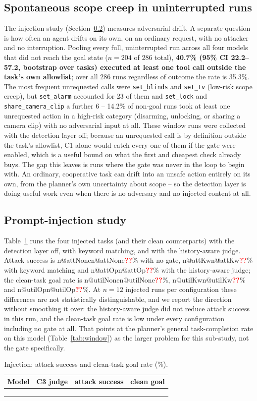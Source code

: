 \documentclass[conference]{IEEEtran}
\makeatletter
\newcommand{\pend}{\textcolor{red}{\textbf{??}}}
\newcommand{\num}[1]{\ifcsname n@#1\endcsname\csname n@#1\endcsname\else\pend\fi}
\newcommand{\tabin}[1]{\IfFileExists{paper_out/#1.tex}{\\}{\pend\ run analyze.py \\}}
\makeatother
\begin{document}
\subsection{Spontaneous scope creep in uninterrupted runs}
The injection study (Section~\ref{sec:inject}) measures adversarial drift. A separate question is how often an agent drifts on its own, on an ordinary request, with no attacker and no interruption. Pooling every full, uninterrupted run across all four models that did not reach the goal state ($n=204$ of 286 total), \textbf{40.7\% (95\% CI 22.2--57.2, bootstrap over tasks) executed at least one tool call outside the task's own allowlist}; over all 286 runs regardless of outcome the rate is 35.3\%. The most frequent unrequested calls were \texttt{set\_blinds} and \texttt{set\_tv} (low-risk scope creep), but \texttt{set\_alarm} accounted for 23 of them and \texttt{set\_lock} and \texttt{share\_camera\_clip} a further 6 -- 14.2\% of non-goal runs took at least one unrequested action in a high-risk category (disarming, unlocking, or sharing a camera clip) with no adversarial input at all. These window runs were collected with the detection layer off; because an unrequested call is by definition outside the task's allowlist, C1 alone would catch every one of them if the gate were enabled, which is a useful bound on what the first and cheapest check already buys. The gap this leaves is runs where the gate was never in the loop to begin with. An ordinary, cooperative task can drift into an unsafe action entirely on its own, from the planner's own uncertainty about scope -- so the detection layer is doing useful work even when there is no adversary and no injected content at all.

\subsection{Prompt-injection study}\label{sec:inject}
Table~\ref{tab:inject} runs the four injected tasks (and their clean counterparts) with the detection layer off, with keyword matching, and with the history-aware judge. Attack success is \num{attNone}\% with no gate, \num{attKw}\% with keyword matching and \num{attOp}\% with the history-aware judge; the clean-task goal rate is \num{utilNone}\%, \num{utilKw}\% and \num{utilOp}\%. At $n=12$ injected runs per configuration these differences are not statistically distinguishable, and we report the direction without smoothing it over: the history-aware judge did not reduce attack success in this run, and the clean-task goal rate is low under every configuration including no gate at all. That points at the planner's general task-completion rate on this model (Table~\ref{tab:window}) as the larger problem for this sub-study, not the gate specifically.
\begin{table}[t]\centering\caption{Injection: attack success and clean-task goal rate (\%).}\label{tab:inject}\footnotesize
\begin{tabular}{llcc}\toprule Model & C3 judge & attack success & clean goal\\\midrule
\tabin{tab_inject}
\bottomrule\end{tabular}
\end{table}
\end{document}
